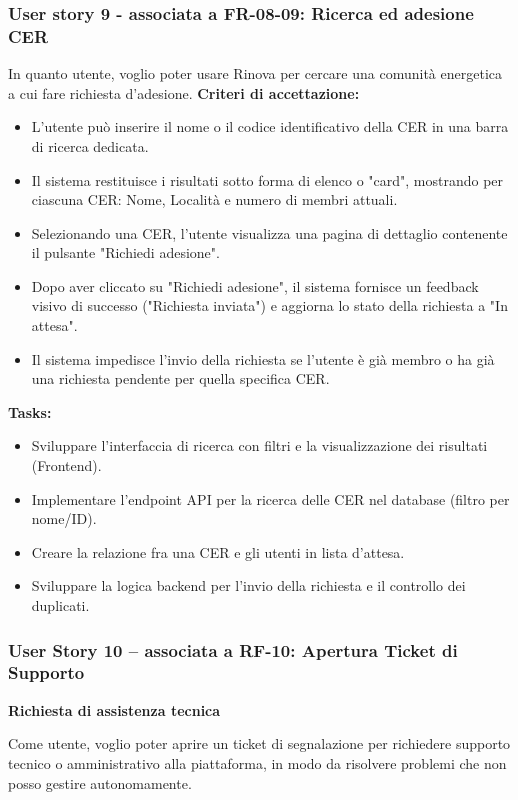 \subsubsection*{User story 9 - associata a FR-08-09: Ricerca ed adesione CER}
In quanto utente, voglio poter usare Rinova per cercare una comunità energetica a cui fare richiesta d'adesione.
\textbf{Criteri di accettazione:}
\begin{itemize}
    \item L'utente può inserire il nome o il codice identificativo della CER in una barra di ricerca dedicata.
    \item Il sistema restituisce i risultati sotto forma di elenco o "card", mostrando per ciascuna CER: Nome, Località e numero di membri attuali.
    \item Selezionando una CER, l'utente visualizza una pagina di dettaglio contenente il pulsante "Richiedi adesione".
    \item Dopo aver cliccato su "Richiedi adesione", il sistema fornisce un feedback visivo di successo ("Richiesta inviata") e aggiorna lo stato della richiesta a "In attesa".
    \item Il sistema impedisce l'invio della richiesta se l'utente è già membro o ha già una richiesta pendente per quella specifica CER.
\end{itemize}
\textbf{Tasks:}
\begin{itemize}
    \item Sviluppare l'interfaccia di ricerca con filtri e la visualizzazione dei risultati (Frontend).
    \item Implementare l'endpoint API per la ricerca delle CER nel database (filtro per nome/ID).
    \item Creare la relazione fra una CER e gli utenti in lista d'attesa.
    \item Sviluppare la logica backend per l'invio della richiesta e il controllo dei duplicati.
\end{itemize}

\subsubsection*{User Story 10 – associata a RF-10: Apertura Ticket di Supporto}
\textbf{Richiesta di assistenza tecnica}

Come utente, voglio poter aprire un ticket di segnalazione per richiedere supporto tecnico o amministrativo alla piattaforma, in modo da risolvere problemi che non posso gestire autonomamente.

